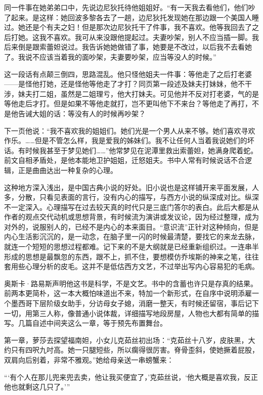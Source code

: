 \par 同一件事在她弟弟口中，先说边尼狄托待他姐姐好。“有一天我去看他们，他们吵了起来。是这样：她回波多黎各去了一趟，边尼狄托发现她在那边跟一个美国人睡过。她还是个有夫之妇！但是那次边尼狄托干了件事，我不喜欢。他等我回去了之后打她。这我不喜欢。我可从来没跟他提起过。夫妻吵架，别人不应当插一脚。我后来倒是跟索蕾妲说过。我告诉她她做错了事，她要是不改过，以后我不去看她了。我说不应该当着我的面吵架，夫妻要吵架，应当等没人的时候。”
\par 这一段话有点颠三倒四，思路混乱。他只怪他姐夫一件事：等他走了之后打老婆——是怪他打她，还是怪他等他走了才打？同页第一段述及妹夫打妹妹，他不干涉，妹夫打二姐，虽然是二姐理亏，他大打妹夫。可见他并不反对打老婆，气的是等他走后才打。但是如果不等他走就打，岂不更叫他下不来台？等他走了再打，不是他告诫大姐的话：等没有人的时候再吵架？
\par 下一页他说：“我不喜欢我的姐姐们。她们光是一个男人从来不够。她们喜欢寻欢作乐。……但是不管怎么样，我是爱我的姊妹们。我不让任何人当着我说她们的坏话。有时候我甚至于梦见她们……”他常梦见在泥潭里救出索蕾妲，她满身爬着蛇。前文自相矛盾处，是他本能地卫护姐姐，迁怒姐夫。书中人常有时候说话不合逻辑，正是曲曲达出一种复杂的心理。
\par 这种地方深入浅出，是中国古典小说的好处。旧小说也是这样铺开来平面发展，人多，分散，只看见表面的言行，没有内心的描写，与西方小说的纵深成对比。纵深不一定深入。心理描写在过去较天真的时代只是三底门答尔的表白。此后大都是从作者的观点交代动机或思想背景，有时候流为演讲或发议论，因为经过整理，成为对外的，说服别人的，已经不是内心的本来面目。“意识流”正针对这种倾向，但是内心生活影沉沉的，是一动念，在脑子里一闪的时候最清楚，要找它的来龙去脉，就连一个短短的思想过程都难。记下来的不是大纲就是已经重新组织过。一连串半形成的思想是最飘忽的东西，跟不上，抓不住，要想模仿乔埃斯的神来之笔，往往套用些心理分析的皮毛。这并不是低估西方文艺，不过举出写内心容易犯的毛病。
\par 奥斯卡·路易斯声明他这书是科学，不是文艺。书中的含蓄也许只是存真的结果。前两本更简朴，这一本大概怕味道出不来，特加一个新形式，在自序中说明添雇一个墨西哥下层阶级女助手，分访母女子媳，消磨一整天，有时候还留宿，事后记下一切，用第三人称，像普通小说体裁，详细描写地段房屋，人物也大都有简单的描写。几篇自述中间夹这么一章，等于预先布置舞台。
\par 第一章，萝莎去探望福南妲，小女儿克茹丝初出场：“克茹丝十八岁，皮肤黑，大约只有四呎九吋高。她一只腿短些，所以瘸得很厉害。脊骨歪斜，使她撅着屁股，双肩向后别着，非常不雅观。”她给母亲送一串螃蟹来：
\par “‘有个人在那儿兜来兜去卖，他让我买便宜了，’克茹丝说，‘他大概是喜欢我，反正他也就剩这几只了。'”
